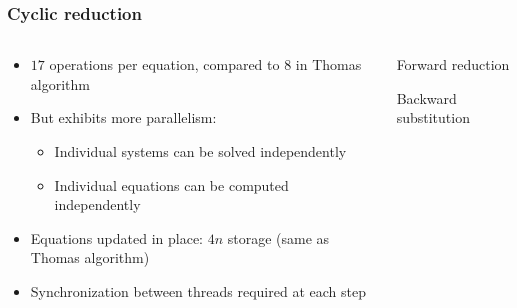 \begin{frame}
\frametitle{Cyclic reduction}
\begin{columns}
\begin{column}{0.5\textwidth}
\begin{itemize}
\item $17$ operations per equation,
    compared to $8$ in Thomas algorithm
\item But exhibits more parallelism:
\begin{itemize}
    \item Individual systems can be solved independently
    \item Individual equations can be computed independently
\end{itemize}
\item Equations updated in place: $4n$ storage (same as Thomas algorithm)
\item Synchronization between threads required at each step
\end{itemize}
\end{column}
\begin{column}{0.5\textwidth}
\centering
Forward reduction

\centering
Backward substitution
\end{column}
\end{columns}
\end{frame}


